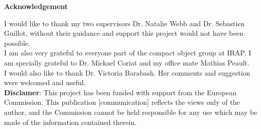 \thispagestyle{empty}
\begin{Large}
\textbf{Acknowledgement}
\end{Large}
\bigbreak

I would like to thank my two supervisors Dr. Natalie Webb and Dr. Sebastien Guillot, without their guidance and support this project would not have been possible. \\

I am also very grateful to everyone part of the compact object group at IRAP. I am specially grateful to Dr. Mickael Coriat and my office mate Mathias Peault.\\ 

I would also like to thank Dr. Victoria Barabash. Her comments and suggestion were welcomed and useful. \\

\textbf{Disclamer}: This project has been funded with support from the European Commission. This publication [communication] reflects the views only of the author, and the Commission cannot be held responsible for any use which may be made of the information contained therein.

\clearpage



